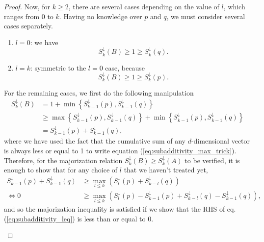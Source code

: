 \begin{proof}
    Now, for $k \geq 2$, there are several cases depending on the value of $l$, which ranges from $0$ to $k$. Having no knowledge over $p$ and $q$, we must consider several cases separately.
    \begin{enumerate}
        \item \underline{$l = 0$}: we have \label{case:0}
        \begin{equation}
            S^\downarrow_k(B) \geq 1 \geq S^\downarrow_k(q).
        \end{equation}
        \item \underline{$l = k$}: symmetric to the $l = 0$ case, because \label{case:k}
        \begin{equation}
            S^\downarrow_k(B) \geq 1 \geq S^\downarrow_k(p).
        \end{equation}
    \end{enumerate}
    For the remaining cases, we first do the following manipulation
    \begin{align}
        S^\downarrow_k(B) &= 1 + \min \left\{S^\downarrow_{k-1}(p), S^\downarrow_{k-1}(q)\right\}\\
                          &\geq \max \left\{S^\downarrow_{k-1}(p), S^\downarrow_{k-1}(q)\right\} + \min \left\{S^\downarrow_{k-1}(p), S^\downarrow_{k-1}(q)\right\} \label{eq:subadditivity_max_trick}\\
                          &= S^\downarrow_{k-1}(p) + S^\downarrow_{k-1}(q),
    \end{align}
    where we have used the fact that the cumulative sum of any $d$-dimensional vector is always less or equal to 1 to write equation (\ref{eq:subadditivity_max_trick}). Therefore, for the majorization relation $S^\downarrow_k(B) \geq S^\downarrow_k(A)$ to be verified, it is enough to show that for any choice of $l$ that we haven't treated yet,
    \begin{align}
                          S^\downarrow_{k-1}(p) + S^\downarrow_{k-1}(q) &\geq \max_{l \leq k} \left(S^\downarrow_l (p) + S^\downarrow_{k-l} (q)\right)\\
                                                                        \iff 0 &\geq \max_{l \leq k} \left(S^\downarrow_l (p) - S^\downarrow_{k-1}(p) + S^\downarrow_{k-l} (q) - S^\downarrow_{k-1}(q)\right), \label{eq:subadditivity_leq}
    \end{align}
    and so the majorization inequality is satisfied if we show that the RHS of eq. (\ref{eq:subadditivity_leq}) is less than or equal to 0.
    \begin{enumerate}[resume]

\end{enumerate}
\end{proof}
